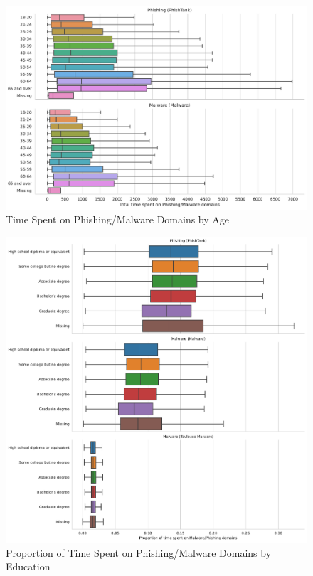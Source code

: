 \documentclass[12pt, letterpaper]{article}
\begin{document}
\begin{figure}[!htb]
	 \centering
	 \caption{Time Spent on Phishing/Malware Domains by Age}
	 \label{fig:prop_total_time_phishing_malware_age}
	 \includegraphics[width=\textwidth]{../figs/total_time_phishing_malware_age.pdf}
\end{figure}

\begin{figure}[!htb]
\centering
\caption{Proportion of Time Spent on Phishing/Malware Domains by Education}
	\label{fig:prop_total_time_phishing_malware_educ}
	\includegraphics[width=\textwidth]{../figs/prop_total_time_phishing_malware_tl_educ.pdf}
\end{figure}
\end{document}
